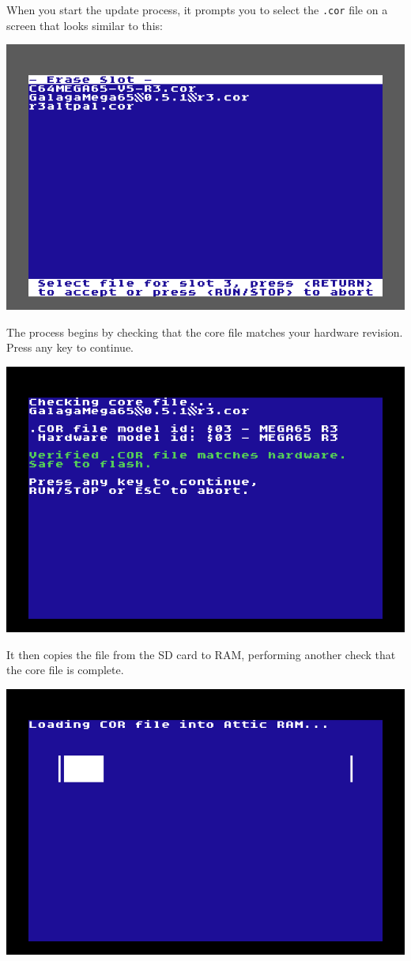 When you start the update process, it prompts you to select the {\tt .cor} file on a screen that looks similar to this:

\begin{center}
  \includegraphics[width=0.7\linewidth]{images/ss-flashmenu-selectcore.png}
\end{center}

The process begins by checking that the core file matches your hardware revision. Press any key to continue.

\begin{center}
  \includegraphics[width=0.7\linewidth]{images/ss-flashmenu-1-checking.png}
\end{center}

It then copies the file from the SD card to RAM, performing another check that the core file is complete.

\begin{center}
  \includegraphics[width=0.7\linewidth]{images/ss-flashmenu-2-loading.png}
\end{center}

